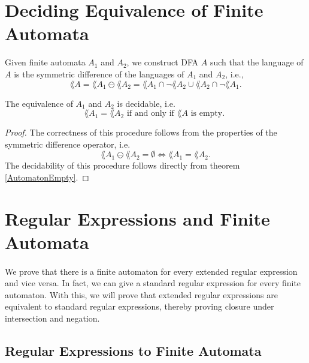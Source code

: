 \documentclass[11pt,a4paper,oneside]{book}
\begin{document}

        \section{Deciding Equivalence of Finite Automata}
            Given finite automata $A_1$ and $A_2$, we construct DFA $A$ such that the language of $A$ is the symmetric difference of the languages of $A_1$ and $A_2$, i.e.,
            \[ 
                \lang{A} = \lang{A_1} \ominus \lang{A_2} = \lang{A_1} \cap \neg \lang{A_2} \cup \lang{A_2} \cap \neg \lang{A_1}.
            \]
            \begin{theorem} The equivalence of $A_1$ and $A_2$ is decidable, i.e.
                \[
                    \lang{A_1} = \lang{A_2} \mbox{ if and only if } \lang{A} \mbox{ is empty. }
                \]
            \end{theorem}
            \begin{proof}
                The correctness of this procedure follows from the properties of the symmetric difference operator, i.e.
                \[ 
                    \lang{A_1} \ominus \lang{A_2} = \emptyset \Leftrightarrow \lang{A_1} = \lang{A_2}.
                \]
                The decidability of this procedure follows directly from theorem \ref{AutomatonEmpty}.
            \end{proof}

            
        \section{Regular Expressions and Finite Automata}

            \paragraph{} 
                We prove that there is a finite automaton for every extended regular expression and vice versa. 
                In fact, we can give a standard regular expression for every finite automaton.
                With this, we will prove that extended regular expressions are equivalent to standard regular expressions, 
                thereby proving closure under intersection and negation.
                

            \subsection{Regular Expressions to Finite Automata}
\end{document}
